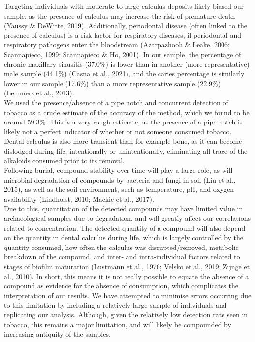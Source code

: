 \documentclass[
]{article}
\begin{document}
Targeting individuals with moderate-to-large calculus deposits likely
biased our sample, as the presence of calculus may increase the risk of
premature death (Yaussy \& DeWitte, 2019). Additionally, periodontal
disease (often linked to the presence of calculus) is a risk-factor for
respiratory diseases, if periodontal and respiratory pathogens enter the
bloodstream (Azarpazhooh \& Leake, 2006; Scannapieco, 1999; Scannapieco
\& Ho, 2001). In our sample, the percentage of chronic maxillary
sinusitis (37.0\%) is lower than in another (more representative) male
sample (44.1\%) (Casna et al., 2021), and the caries percentage is
similarly lower in our sample (17.6\%) than a more representative sample
(22.9\%) (Lemmers et al., 2013).\\
We used the presence/absence of a pipe notch and concurrent detection of
tobacco as a crude estimate of the accuracy of the method, which we
found to be around 59.3\%. This is a very rough estimate, as the
presence of a pipe notch is likely not a perfect indicator of whether or
not someone consumed tobacco. Dental calculus is also more transient
than for example bone, as it can become dislodged during life,
intentionally or unintentionally, eliminating all trace of the alkaloids
consumed prior to its removal.\\
Following burial, compound stability over time will play a large role,
as will microbial degradation of compounds by bacteria and fungi in soil
(Liu et al., 2015), as well as the soil environment, such as
temperature, pH, and oxygen availability (Lindholst, 2010; Mackie et
al., 2017).\\
Due to this, quantitation of the detected compounds may have limited
value in archaeological samples due to degradation, and will greatly
affect our correlations related to concentration. The detected quantity
of a compound will also depend on the quantity in dental calculus during
life, which is largely controlled by the quantity consumed, how often
the calculus was disrupted/removed, metabolic breakdown of the compound,
and inter- and intra-individual factors related to stages of biofilm
maturation (Lustmann et al., 1976; Velsko et al., 2019; Zijnge et al.,
2010). In short, this means it is not really possible to equate the
absence of a compound as evidence for the absence of consumption, which
complicates the interpretation of our results. We have attempted to
minimise errors occurring due to this limitation by including a
relatively large sample of individuals and replicating our analysis.
Although, given the relatively low detection rate seen in tobacco, this
remains a major limitation, and will likely be compounded by increasing
antiquity of the samples.
\end{document}

